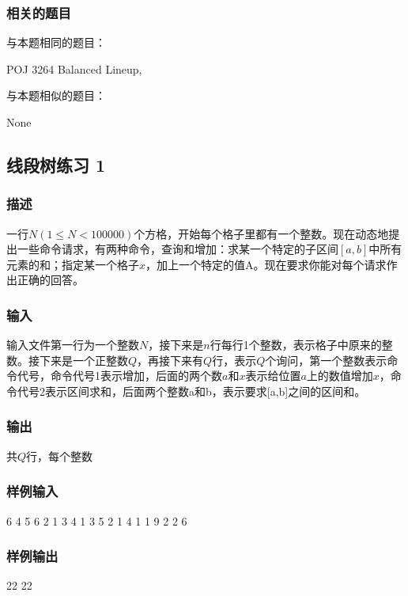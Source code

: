 \subsubsection{相关的题目}
与本题相同的题目：
\begindot
\item POJ 3264 Balanced Lineup, 
\myenddot

与本题相似的题目：
\begindot
\item  None
\myenddot


\subsection{线段树练习 1} %
\subsubsection{描述}
一行$N(1\leq N < 100000)$个方格，开始每个格子里都有一个整数。现在动态地提出一些命令请求，有两种命令，查询和增加：求某一个特定的子区间$[a,b]$中所有元素的和；指定某一个格子$x$，加上一个特定的值A。现在要求你能对每个请求作出正确的回答。

\subsubsection{输入}
输入文件第一行为一个整数$N$，接下来是$n$行每行1个整数，表示格子中原来的整数。接下来是一个正整数$Q$，再接下来有$Q$行，表示$Q$个询问，第一个整数表示命令代号，命令代号1表示增加，后面的两个数$a$和$x$表示给位置$a$上的数值增加$x$，命令代号2表示区间求和，后面两个整数a和b，表示要求[a,b]之间的区间和。

\subsubsection{输出}
共$Q$行，每个整数

\subsubsection{样例输入}
\begin{Code}
6
4 
5 
6 
2 
1 
3
4
1 3 5
2 1 4
1 1 9
2 2 6
\end{Code}

\subsubsection{样例输出}
\begin{Code}
22
22
\end{Code}


